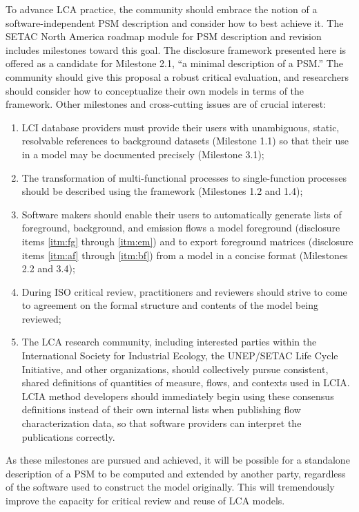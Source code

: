To advance LCA practice, the community should embrace the notion of a software-independent PSM description and consider how to best achieve it.  The SETAC North America roadmap module for PSM description and revision \citep{Kuczenski_JLCA_2018} includes milestones toward this goal.  The disclosure framework presented here is offered as a candidate for Milestone 2.1, ``a minimal description of a PSM.''  The community should give this proposal a robust critical evaluation, and researchers should consider how to conceptualize their own models in terms of the framework.  Other milestones and cross-cutting issues are of crucial interest:
\begin{enumerate}[label=(\alph*)]
\item LCI database providers must provide their users with unambiguous, static, resolvable references to background datasets (Milestone 1.1) so that their use in a model may be documented precisely (Milestone 3.1);
\item The transformation of multi-functional processes to single-function processes should be described using the framework (Milestones 1.2 and 1.4);
\item Software makers should enable their users to automatically generate lists of foreground, background, and emission flows a model foreground (disclosure items \ref{itm:fg} through \ref{itm:em}) and to export foreground matrices (disclosure items \ref{itm:af} through \ref{itm:bf}) from a model in a concise format (Milestones 2.2 and 3.4);
\item During ISO critical review, practitioners and reviewers should strive to come to agreement on the formal structure and contents of the model being reviewed;
\item The LCA research community, including interested parties within the International Society for Industrial Ecology, the UNEP/SETAC Life Cycle Initiative, and other organizations, should collectively pursue consistent, shared definitions of quantities of measure, flows, and contexts used in LCIA.  %
LCIA method developers should immediately begin using these consensus definitions instead of their own internal lists when publishing flow characterization data, so that software providers can interpret the publications correctly.  %
\end{enumerate}
As these milestones are pursued and achieved, it will be possible for a standalone description of a PSM to be computed and extended by another party, regardless of the software used to construct the model originally.  This will tremendously improve the capacity for critical review and reuse of LCA models.

